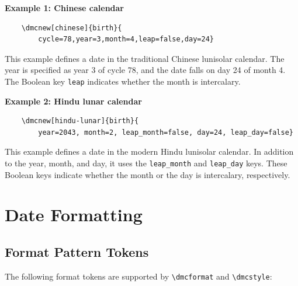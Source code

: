 \documentclass[10pt]{article}
\begin{document}
\textbf{Example 1: Chinese calendar}\par

\begin{verbatim}
    \dmcnew[chinese]{birth}{
        cycle=78,year=3,month=4,leap=false,day=24}
\end{verbatim}

This example defines a date in the traditional Chinese lunisolar
calendar.  The year is specified as year 3 of cycle 78, and the
date falls on day 24 of month 4.  The Boolean key \texttt{leap}
indicates whether the month is intercalary.

\textbf{Example 2: Hindu lunar calendar}\par

\begin{verbatim}
    \dmcnew[hindu-lunar]{birth}{
        year=2043, month=2, leap_month=false, day=24, leap_day=false}
\end{verbatim}

This example defines a date in the modern Hindu lunisolar calendar.
In addition to the year, month, and day, it uses the
\texttt{leap\_month} and \texttt{leap\_day} keys.  These Boolean
keys indicate whether the month or the day is intercalary,
respectively.








\section{Date Formatting}

\subsection{Format Pattern Tokens}

The following format tokens are supported by
\verb|\dmcformat| and \verb|\dmcstyle|:
\end{document}
